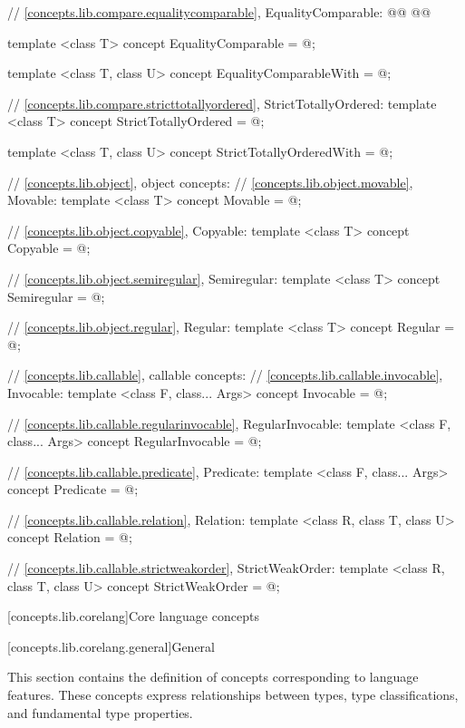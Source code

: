 \begin{addedblock}
\begin{codeblock}
{  // \ref{concepts.lib.compare.equalitycomparable}, EqualityComparable:
  @@
  @@

  template <class T>
  concept EqualityComparable = @\seebelow@;

  template <class T, class U>
  concept EqualityComparableWith = @\seebelow@;

  // \ref{concepts.lib.compare.stricttotallyordered}, StrictTotallyOrdered:
  template <class T>
  concept StrictTotallyOrdered = @\seebelow@;

  template <class T, class U>
  concept StrictTotallyOrderedWith = @\seebelow@;

  // \ref{concepts.lib.object}, object concepts:
  // \ref{concepts.lib.object.movable}, Movable:
  template <class T>
  concept Movable = @\seebelow@;

  // \ref{concepts.lib.object.copyable}, Copyable:
  template <class T>
  concept Copyable = @\seebelow@;

  // \ref{concepts.lib.object.semiregular}, Semiregular:
  template <class T>
  concept Semiregular = @\seebelow@;

  // \ref{concepts.lib.object.regular}, Regular:
  template <class T>
  concept Regular = @\seebelow@;

  // \ref{concepts.lib.callable}, callable concepts:
  // \ref{concepts.lib.callable.invocable}, Invocable:
  template <class F, class... Args>
  concept Invocable = @\seebelow@;

  // \ref{concepts.lib.callable.regularinvocable}, RegularInvocable:
  template <class F, class... Args>
  concept RegularInvocable = @\seebelow@;

  // \ref{concepts.lib.callable.predicate}, Predicate:
  template <class F, class... Args>
  concept Predicate = @\seebelow@;

  // \ref{concepts.lib.callable.relation}, Relation:
  template <class R, class T, class U>
  concept Relation = @\seebelow@;

  // \ref{concepts.lib.callable.strictweakorder}, StrictWeakOrder:
  template <class R, class T, class U>
  concept StrictWeakOrder = @\seebelow@;
}
\end{codeblock}

[concepts.lib.corelang]{Core language concepts}

[concepts.lib.corelang.general]{General}

\pnum
This section contains the definition of concepts corresponding to language features.
These concepts express relationships between types, type classifications, and
fundamental type properties.


\end{addedblock}
